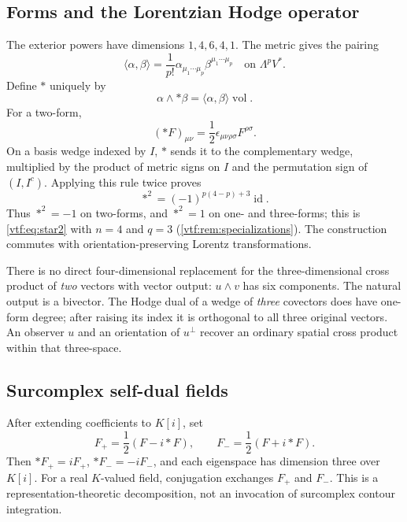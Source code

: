 \documentclass[11pt,letterpaper]{article}
\theoremstyle{definition}
\theoremstyle{remark}
\newcommand{\id}{\operatorname{id}}\newcommand{\tr}{\operatorname{tr}}
\newcommand{\vol}{\operatorname{vol}}\newcommand{\GL}{\operatorname{GL}}
\begin{document}
\subsection{Forms and the Lorentzian Hodge operator}
The exterior powers have dimensions $1,4,6,4,1$. The metric gives the pairing
\begin{equation}
 \langle\alpha,\beta\rangle
 =\frac1{p!}\alpha_{\mu_1\cdots\mu_p}
                  \beta^{\mu_1\cdots\mu_p}
 \quad\text{on }\Lambda^pV^*.
\end{equation}
Define $*$ uniquely by
\begin{equation}\label{vtf:mink:eq:hodge}
 \alpha\wedge*\beta=\langle\alpha,\beta\rangle\vol.
\end{equation}
For a two-form,
\begin{equation}
 (* F)_{\mu\nu}
 =\frac12\epsilon_{\mu\nu\rho\sigma}F^{\rho\sigma}.
\end{equation}
On a basis wedge indexed by $I$, $*$ sends it to the complementary wedge, multiplied by the product of metric signs on $I$ and the permutation sign of $(I,I^c)$. Applying this rule twice proves
\begin{equation}\label{vtf:mink:eq:starsquare}
 *^2=(-1)^{p(4-p)+3}\id.
\end{equation}
Thus $*^2=-1$ on two-forms, and $*^2=1$ on one- and three-forms; this is
\eqref{vtf:eq:star2} with $n=4$ and $q=3$ (\cref{vtf:rem:specializations}). The construction commutes with orientation-preserving Lorentz transformations.

There is no direct four-dimensional replacement for the three-dimensional cross product of \emph{two} vectors with vector output: $u\wedge v$ has six components. The natural output is a bivector. The Hodge dual of a wedge of \emph{three} covectors does have one-form degree; after raising its index it is orthogonal to all three original vectors. An observer $u$ and an orientation of $u^\perp$ recover an ordinary spatial cross product within that three-space.

\subsection{Surcomplex self-dual fields}
After extending coefficients to $K[i]$, set
\begin{equation}
 F_+=\frac12(F-i* F),\qquad
 F_-=\frac12(F+i* F).
\end{equation}
Then $* F_+=iF_+$, $* F_-=-iF_-$, and each eigenspace has dimension three over $K[i]$. For a real $K$-valued field, conjugation exchanges $F_+$ and $F_-$. This is a representation-theoretic decomposition, not an invocation of surcomplex contour integration.
\end{document}
